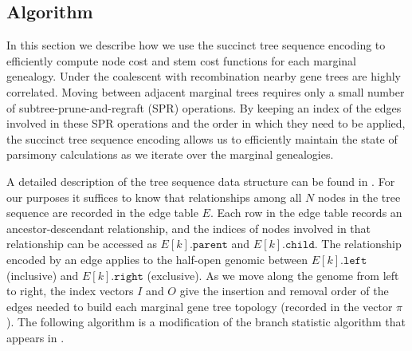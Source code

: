 
\subsection{Algorithm}

In this section we describe how we use the succinct tree sequence encoding
\cite{Kelleher_etal_2016} to efficiently compute node cost and stem cost 
functions for each marginal genealogy. Under the coalescent with recombination 
nearby gene trees are highly correlated. Moving between adjacent marginal trees 
requires only a small number of subtree-prune-and-regraft (SPR) operations. By 
keeping an index of the edges involved in these SPR operations and the order in 
which they need to be applied, the succinct tree sequence encoding allows us to 
efficiently maintain the state of parsimony calculations as we iterate over the 
marginal genealogies.

A detailed description of the tree sequence data structure can be found in
\cite{Kelleher_etal_2016}. For our purposes it suffices to know that
relationships among all $N$ nodes in the tree sequence are recorded in the edge 
table $E$. Each row in the edge table records an ancestor-descendant
relationship, and the indices of nodes involved in that relationship can be 
accessed as $E[k].\texttt{parent}$ and  $E[k].\texttt{child}$. The relationship 
encoded by an edge applies to the half-open genomic between $E[k].\texttt{left}$ 
(inclusive) and $E[k].\texttt{right}$ (exclusive). As we move along the genome 
from left to right, the index vectors $I$ and $O$ give the insertion and
removal order of the edges needed to build each marginal gene tree topology 
(recorded in the vector $\pi$). The following algorithm is a modification of
the branch statistic algorithm that appears in \cite{Ralph_etal_2020}.

